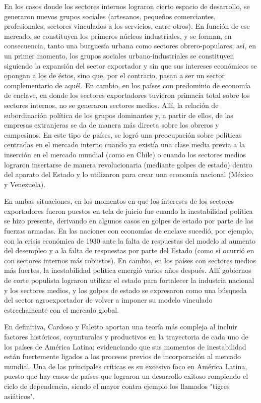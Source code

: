 \documentclass{article}
\begin{document}
En los casos donde los sectores internos lograron cierto espacio de desarrollo, se generaron
nuevos grupos sociales (artesanos, pequeños comerciantes, profesionales, sectores vinculados
a los servicios, entre otros). En función de ese mercado, se constituyen los primeros 
núcleos industriales, y se forman, en consecuencia, tanto una burguesía urbana como sectores 
obrero-populares; así, en un primer momento, los grupos sociales urbano-industriales se 
constituyen siguiendo la expansión del sector exportador y sin que sus intereses económicos 
se opongan a los de éstos, sino que, por el contrario, pasan a ser un sector complementario 
de aquél. En cambio, en los países con predominio de economía de enclave, en donde los 
sectores exportadores tuvieron primacía total sobre los sectores internos, no se generaron 
sectores medios. Allí, la relación de subordinación política de los grupos dominantes y, a 
partir de ellos, de las empresas extranjeras se da de manera más directa sobre los obreros y 
campesinos. En este tipo de países, se logró una preocupación sobre políticas centradas en 
el mercado interno cuando ya existía una clase media previa a la inserción en el mercado 
mundial (como en Chile) o cuando los sectores medios lograron insertarse de manera 
revolucionaria (mediante golpes de estado) dentro del aparato  del Estado y lo utilizaron 
para crear una economía nacional (México y Venezuela).

En ambas situaciones, en los momentos en que los intereses de los sectores exportadores
fueron puestos en tela de juicio fue cuando la inestabilidad política se hizo presente, 
derivando en algunos casos en golpes de estado por parte de las fuerzas armadas. En las
naciones con economías de enclave sucedió, por ejemplo, con la crisis económica de 1930
ante la falta de respuestas del modelo al aumento del desempleo y a la falta de respuestas
por parte del Estado (como si ocurrió en con sectores internos más robustos). En cambio,
en los países con sectores medios más fuertes, la inestabilidad política emergió varios
años después. Allí gobiernos de corte populista lograron utilizar el estado para fortalecer
la industria nacional y los sectores medios, y los golpes de estado se expresaron como
una búsqueda del sector agroexportador de volver a imponer su modelo vinculado estrechamente
con el mercado global.

En definitiva, Cardoso y Faletto aportan una teoría más compleja al incluir factores
históricos, coyunturales y productivos en la trayectoria de cada uno de los países de 
América Latina; evidenciando que sus momentos de inestabilidad están fuertemente ligados
a los procesos previos de incorporación al mercado mundial. Una de las principales críticas
es su excesivo foco en América Latina, puesto que hay casos de países que lograron un 
desarrollo exitoso rompiendo el ciclo de dependencia, siendo el mayor contra ejemplo los
llamados "tigres asiáticos".
\end{document}
